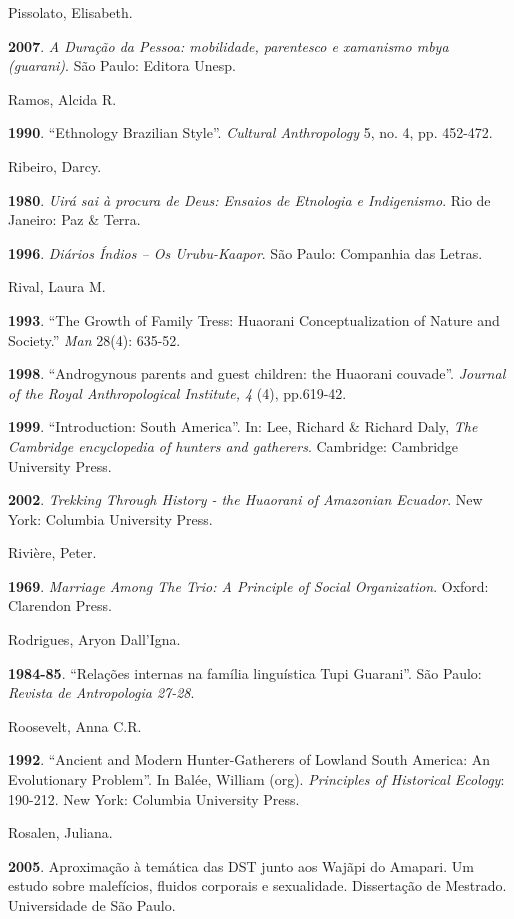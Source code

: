 Pissolato, Elisabeth.

\textbf{2007}. \emph{A Duração da Pessoa: mobilidade, parentesco e
xamanismo mbya (guarani)}. São Paulo: Editora Unesp.

Ramos, Alcida R.

\textbf{1990}. ``Ethnology Brazilian Style''. \emph{Cultural Anthropology}
5, no. 4, pp. 452-472.

Ribeiro, Darcy.

\textbf{1980}. \emph{Uirá sai à procura de Deus: Ensaios de Etnologia e
Indigenismo}. Rio de Janeiro: Paz \& Terra.

\textbf{1996}. \emph{Diários Índios -- Os Urubu-Kaapor}. São Paulo:
Companhia das Letras.

Rival, Laura M.

\textbf{1993}. ``The Growth of Family Tress: Huaorani Conceptualization
of Nature and Society.'' \emph{Man} 28(4): 635-52.

\textbf{1998}. ``Androgynous parents and guest children: the Huaorani
couvade''. \emph{Journal of the Royal Anthropological Institute, 4} (4),
pp.619-42.

\textbf{1999}. ``Introduction: South America''. In: Lee, Richard \& Richard
Daly, \emph{The Cambridge encyclopedia of hunters and gatherers}.
Cambridge: Cambridge University Press.

\textbf{2002}. \emph{Trekking Through History - the Huaorani of
Amazonian Ecuador}. New York: Columbia University Press.

Rivière, Peter.

\textbf{1969}. \emph{Marriage Among The Trio: A Principle of Social
Organization}. Oxford: Clarendon Press.

Rodrigues, Aryon Dall'Igna.

\textbf{1984-85}. ``Relações internas na família linguística Tupi
Guarani''. São Paulo: \emph{Revista de Antropologia 27-28}.

Roosevelt, Anna C.R.

\textbf{1992}. ``Ancient and Modern Hunter-Gatherers of Lowland South
America: An Evolutionary Problem''. In Balée, William (org).
\emph{Principles of Historical Ecology}: 190-212. New York: Columbia
University Press.

Rosalen, Juliana.

\textbf{2005}. Aproximação à temática das DST junto aos Wajãpi do
Amapari. Um estudo sobre malefícios, fluidos corporais e sexualidade.
Dissertação de Mestrado. Universidade de São Paulo.

